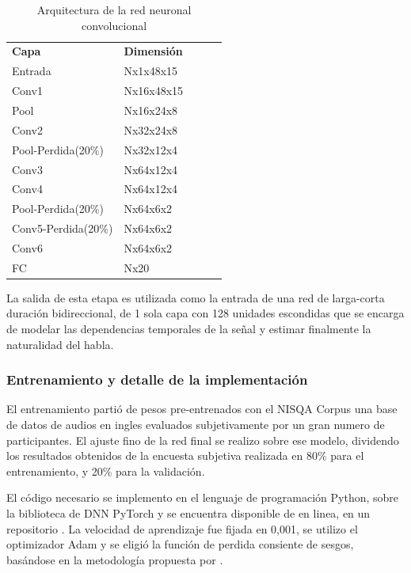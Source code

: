 \begin{table}[]
\centering
\caption{Arquitectura de la red neuronal convolucional}
\label{tab:cnn}
\begin{tabular}{lllll}
\textbf{Capa}      & \textbf{Dimensión} &  &  &  \\ \cline{1-2}
Entrada            & Nx1x48x15          &  &  &  \\ \cline{1-2}
Conv1              & Nx16x48x15         &  &  &  \\
Pool               & Nx16x24x8          &  &  &  \\ \cline{1-2}
Conv2              & Nx32x24x8          &  &  &  \\
Pool-Perdida(20\%)  & Nx32x12x4          &  &  &  \\ \cline{1-2}
Conv3              & Nx64x12x4          &  &  &  \\
Conv4              & Nx64x12x4          &  &  &  \\
Pool-Perdida(20\%)  & Nx64x6x2           &  &  &  \\ \cline{1-2}
Conv5-Perdida(20\%) & Nx64x6x2           &  &  &  \\
Conv6              & Nx64x6x2           &  &  &  \\ \cline{1-2}
FC                 & Nx20               &  &  & 
\end{tabular}
\end{table}

La salida de esta etapa es utilizada como la entrada de una red de larga-corta duración bidireccional, de 1 sola capa con 128 unidades escondidas que se encarga de modelar las dependencias temporales de la señal y estimar finalmente la naturalidad del habla.

\subsubsection{Entrenamiento y detalle de la implementación}
El entrenamiento partió de pesos pre-entrenados con el NISQA Corpus \cite{nisqacorpus} una base de datos de audios en ingles evaluados subjetivamente por un gran numero de participantes. El ajuste fino de la red final se realizo sobre ese modelo, dividendo los resultados obtenidos de la encuesta subjetiva realizada en 80\% para el entrenamiento, y 20\% para la validación. 

El código necesario se implemento en el lenguaje de programación Python, sobre la biblioteca de DNN PyTorch y se encuentra disponible de en linea, en un repositorio \cite{repogit}. La velocidad de aprendizaje fue fijada en 0,001, se utilizo el optimizador Adam y se eligió la función de perdida consiente de sesgos, basándose en la metodología propuesta por \cite{biasloss}.


